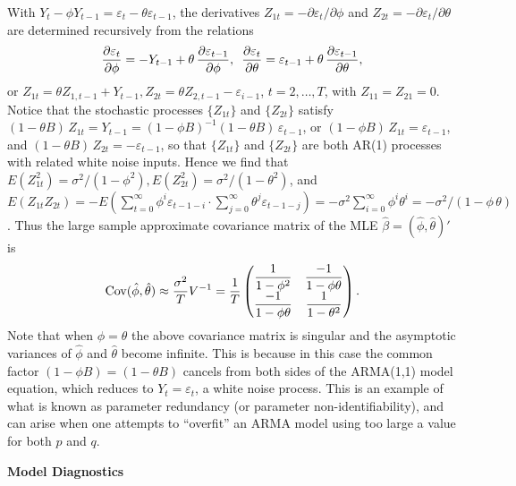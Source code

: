 \begin{ex}
 With $Y_t - \phi Y_{t-1} = \varepsilon_t - \theta\varepsilon_{t-1}$, the derivatives $Z_{1t} = -\partial\varepsilon_t/\partial\phi$ and $Z_{2t} = -\partial\varepsilon_t/\partial\theta$ are determined recursively from the relations
	\[
	\frac{\partial\varepsilon_t}{\partial\phi} = -Y_{t-1} + \theta\, \frac{\partial\varepsilon_{t-1}}{\partial\phi}, \enskip \frac{\partial\varepsilon_t}{\partial\theta} = \varepsilon_{t-1} + \theta \, \frac{\partial\varepsilon_{t-1}}{\partial\theta},
	\]
or $Z_{1t} = \theta Z_{1,t-1} + Y_{t-1}, Z_{2t} = \theta Z_{2,t-1} - \varepsilon_{i-1}$, $t= 2, \ldots, T$, with $Z_{11} = Z_{21} = 0$. Notice that the stochastic processes $\{ Z_{1t} \}$ and $\{ Z_{2t} \}$ satisfy $(1 - \theta B)\, Z_{1t} = Y_{t-1} = (1 - \phi B)^{-1} (1 - \theta B)\, \varepsilon_{t-1}$, or $(1 - \phi B)\, Z_{1t} = \varepsilon_{t-1}$, and $(1 - \theta B)\, Z_{2t} = -\varepsilon_{t-1}$, so that $\{ Z_{1t} \}$ and $\{ Z_{2t} \}$ are both AR(1) processes with related white noise inputs. Hence we find that $E(Z_{1t}^2) = \sigma^2/(1 - \phi^2), E(Z_{2t}^2) = \sigma^2/(1 - \theta^2)$, and $E(Z_{1t}Z_{2t}) = -E\left(\sum_{t=0}^\infty \phi^i \varepsilon_{t-1-i} \cdot \sum_{j=0}^\infty \theta^j \varepsilon_{t-1-j} \right) = -\sigma^2 \sum_{i=0}^\infty \phi^i \theta^i = -\sigma^2/(1 - \phi\,\theta)$. Thus the large sample approximate covariance matrix of the MLE $\hat{\beta} = (\hat{\phi},\hat{\theta})'$ is
	\[
	\operatorname{Cov}(\hat{\phi}, \hat{\theta}) \approx \frac{\sigma^2}{T} V^{-1} = \frac{1}{T} 
	\begin{pmatrix}
	\dfrac{1}{1-\phi^2} & \dfrac{-1}{1-\phi \theta} \\
	\dfrac{-1}{1-\phi \theta} & \dfrac{1}{1-\theta^2}
	\end{pmatrix}.
	\]
Note that when $\phi = \theta$ the above covariance matrix is singular and the asymptotic variances of $\hat{\phi}$ and $\hat{\theta}$ become infinite. This is because in this case the common factor $(1- \phi B) = (1 - \theta B)$ cancels from both sides of the ARMA(1,1) model equation, which reduces to $Y_t = \varepsilon_t$, a white noise process. This is an example of what is known as parameter redundancy (or parameter non-identifiability), and can arise when one attempts to ``overfit'' an ARMA model using too large a value for both $p$ and $q$. \xqed \\
\end{ex}


\noindent\textbf{Model Diagnostics} \\



